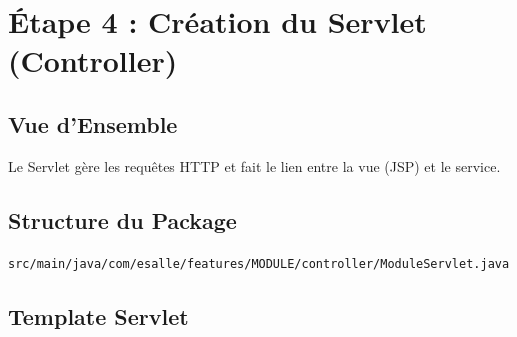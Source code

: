 \documentclass[12pt,a4paper]{article}
\begin{document}
\section{Étape 4 : Création du Servlet (Controller)}

\subsection{Vue d'Ensemble}

Le Servlet gère les requêtes HTTP et fait le lien entre la vue (JSP) et le service.

\subsection{Structure du Package}

\begin{tcolorbox}[colback=gray!10]
\texttt{src/main/java/com/esalle/features/MODULE/controller/ModuleServlet.java}
\end{tcolorbox}

\subsection{Template Servlet}
\end{document}
